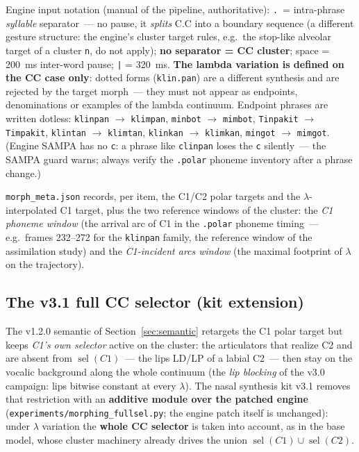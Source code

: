 \documentclass[11pt,a4paper]{article}
\newcommand{\lam}{\lambda}
\newcommand{\code}[1]{\texttt{#1}}
\newcommand{\sectref}[1]{Section~\ref{#1}}
\begin{document}
\begin{keybox}
Engine input notation (manual of the pipeline, authoritative):
\code{.}~= intra-phrase \emph{syllable} separator~--- no pause, it
\emph{splits} C.C into a boundary sequence (a different gesture
structure: the engine's cluster target rules, e.g.\ the stop-like
alveolar target of a cluster \code{n}, do not apply);
\textbf{no separator = CC cluster}; space = 200~ms inter-word pause;
\code{|} = 320~ms.  \textbf{The lambda variation is defined on the
CC case only}: dotted forms (\code{klin.pan}) are a different
synthesis and are rejected by the target morph~--- they must not
appear as endpoints, denominations or examples of the lambda
continuum.  Endpoint phrases are written dotless:
\code{klinpan} $\to$ \code{klimpan}, \code{minbot} $\to$
\code{mimbot}, \code{Tinpakit} $\to$ \code{Timpakit},
\code{klintan} $\to$ \code{klimtan}, \code{klinkan} $\to$
\code{klimkan}, \code{mingot} $\to$ \code{mimgot}.  (Engine SAMPA
has no \code{c}: a phrase like \code{clinpan} loses the \code{c}
silently~--- the SAMPA guard warns; always verify the \code{.polar}
phoneme inventory after a phrase change.)
\end{keybox}

\code{morph\_meta.json} records, per item, the C1/C2 polar targets
and the $\lam$-interpolated C1 target, plus the two reference
windows of the cluster: the \emph{C1 phoneme window} (the arrival
arc of C1 in the \code{.polar} phoneme timing~--- e.g.\ frames
232--272 for the \code{klinpan} family, the reference window of the
assimilation study) and the \emph{C1-incident arcs window} (the
maximal footprint of $\lam$ on the trajectory).

\subsection{The v3.1 full CC selector (kit extension)}\label{sec:fullsel}

The v1.2.0 semantic of \sectref{sec:semantic} retargets the C1 polar
target but keeps \emph{C1's own selector} active on the cluster: the
articulators that realize C2 and are absent from
$\operatorname{sel}(C1)$~--- the lips LD/LP of a labial C2~--- then
stay on the vocalic background along the whole continuum (the
\emph{lip blocking} of the v3.0 campaign: lips bitwise constant at
every $\lam$).  The nasal synthesis kit v3.1 removes that restriction
with an \textbf{additive module over the patched engine}
(\code{experiments/morphing\_fullsel.py}; the engine patch itself is
unchanged): under $\lam$ variation the \textbf{whole CC selector} is
taken into account, as in the base model, whose cluster machinery
already drives the union $\operatorname{sel}(C1) \cup
\operatorname{sel}(C2)$.
\end{document}

